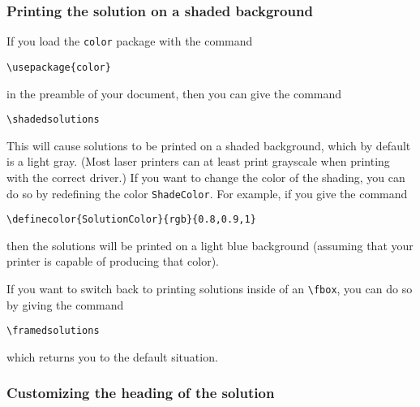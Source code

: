 \documentclass[12pt]{exam}
\begin{document}
\subsubsection{Printing the solution on a shaded background}
\label{sec:shaded}

If you load the \verb"color" package with the command
\begin{center}
  \verb"\usepackage{color}"
\end{center}
in the preamble of your document, then you can give the command
\begin{center}
  \verb"\shadedsolutions"
\end{center}
This will cause solutions to be printed on a shaded background, which
by default is a light gray.  (Most laser printers can at least print
grayscale when printing with the correct driver.)  If you want to
change the color of the shading, you can do so by redefining the color
\verb"ShadeColor".  For example, if you give the command
\begin{center}
  \verb"\definecolor{SolutionColor}{rgb}{0.8,0.9,1}"
\end{center}
then the solutions will be printed on a light blue background
(assuming that your printer is capable of producing that color).

If you want to switch back to printing solutions inside of an
\verb"\fbox", you can do so by giving the command
\begin{center}
  \verb"\framedsolutions"
\end{center}
which returns you to the default situation.


\subsubsection{Customizing the heading of the solution}
\label{sec:SolCust}
\end{document}
